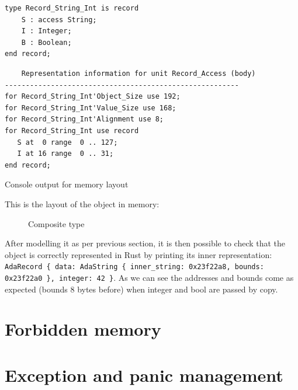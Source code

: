 \documentclass[nomenclature, english, bibtex]{kththesis}
\newcommand{\inlinecode}[1]{\texttt{#1}}
\begin{document}
\begin{listing}[!ht]
\begin{verbatim}
type Record_String_Int is record
    S : access String;
    I : Integer;
    B : Boolean;
end record;
\end{verbatim}
\label{lst:composite}
\end{listing}
\FloatBarrier

\begin{listing}[!ht]
\begin{verbatim}
    Representation information for unit Record_Access (body)
--------------------------------------------------------
for Record_String_Int'Object_Size use 192;
for Record_String_Int'Value_Size use 168;
for Record_String_Int'Alignment use 8;
for Record_String_Int use record
   S at  0 range  0 .. 127;
   I at 16 range  0 .. 31;
end record;
\end{verbatim}
\caption[mem layout output]{Console output for memory layout}
\label{lst:gnatrj}
\end{listing}
\FloatBarrier

This is the layout of the object in memory:

\begin{figure}[ht!]
    \centering
  \caption{Composite type}
  \label{fig:memlayout}
\end{figure}

After modelling it as per previous section, it is then possible to check that the object is correctly represented in Rust by printing its inner representation: 
\inlinecode{AdaRecord \{ data: AdaString \{ inner\_string: 0x23f22a8, bounds: 0x23f22a0 \}, integer: 42 \}}. As we can see the addresses and bounds come as expected (bounds 8 bytes before) when integer and bool are passed by copy.

\section{Forbidden memory}


\section{Exception and panic management}
\end{document}
